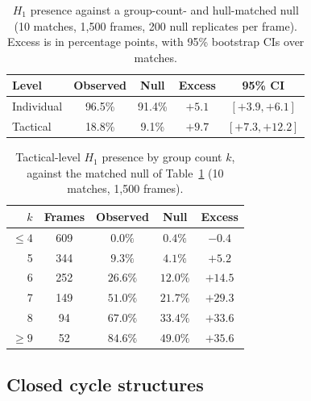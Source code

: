 \begin{table}[h]
\centering
\caption{\texorpdfstring{$H_1$}{} presence against a group-count- and hull-matched null (10 matches, 1{,}500 frames, 200 null replicates per frame). Excess is in percentage points, with 95\% bootstrap CIs over matches.}
\label{tab:null}
\begin{tabular}{@{}lcccc@{}}
\toprule
Level & Observed & Null & Excess & 95\% CI \\
\midrule
Individual & 96.5\% & 91.4\% & $+5.1$ & $[+3.9, +6.1]$ \\
Tactical   & 18.8\% & 9.1\%  & $+9.7$ & $[+7.3, +12.2]$ \\
\bottomrule
\end{tabular}
\end{table}

\begin{table}[h]
\centering
\caption{Tactical-level \texorpdfstring{$H_1$}{} presence by group count \texorpdfstring{$k$}{}, against the matched null of Table~\ref{tab:null} (10 matches, 1{,}500 frames).}
\label{tab:nullk}
\begin{tabular}{@{}rcccc@{}}
\toprule
$k$ & Frames & Observed & Null & Excess \\
\midrule
$\le 4$ & 609 & $0.0\%$ & $0.4\%$ & $-0.4$ \\
5 & 344 & $9.3\%$ & $4.1\%$ & $+5.2$ \\
6 & 252 & $26.6\%$ & $12.0\%$ & $+14.5$ \\
7 & 149 & $51.0\%$ & $21.7\%$ & $+29.3$ \\
8 & 94 & $67.0\%$ & $33.4\%$ & $+33.6$ \\
$\ge 9$ & 52 & $84.6\%$ & $49.0\%$ & $+35.6$ \\
\bottomrule
\end{tabular}
\end{table}

\subsection{Closed cycle structures}
\label{sec:cyclegeometry}


